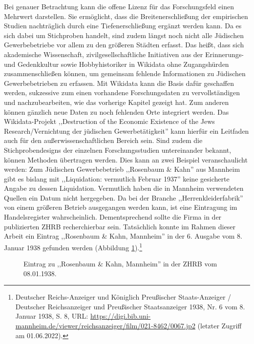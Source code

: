Bei genauer Betrachtung kann die offene Lizenz für das Forschungsfeld einen Mehrwert darstellen. Sie ermöglicht, dass die Breitenerschließung der empirischen Studien nachträglich durch eine Tiefenerschließung ergänzt werden kann. Da es sich dabei um Stichproben handelt, sind zudem längst noch nicht alle Jüdischen Gewerbebetriebe vor allem zu den größeren Städten erfasst. Das heißt, dass sich akademische Wissenschaft, zivilgesellschaftliche Initiativen aus der Erinnerungs- und Gedenkkultur sowie Hobbyhistoriker in Wikidata ohne Zugangshürden zusammenschließen können, um gemeinsam fehlende Informationen zu Jüdischen Gewerbebetrieben zu erfassen. Mit Wikidata kann die Basis dafür geschaffen werden, sukzessive zum einen vorhandene Forschungsdaten zu vervollständigen und nachzubearbeiten, wie das vorherige Kapitel gezeigt hat. Zum anderen können gänzlich neue Daten zu noch fehlenden Orte integriert werden. Das Wikidata-Projekt ,,Destruction of the Economic Existence of the Jews Research/Vernichtung der jüdischen Gewerbetätigkeit'' kann hierfür ein Leitfaden auch für den außerwissenschaftlichen Bereich sein. Sind zudem die Stichprobendesigns der einzelnen Forschungsstudien untereinander bekannt, können Methoden übertragen werden. Dies kann an zwei Beispiel veranschaulicht werden: Zum Jüdischen Gewerbebetrieb ,,Rosenbaum \& Kahn'' aus Mannheim gibt es bislang mit ,,Liquidation: vermutlich Februar 1937'' keine gesicherte Angabe zu dessen Liquidation. Vermutlich haben die in Mannheim verwendeten Quellen ein Datum nicht hergegeben. Da bei der Branche ,,Herrenkleiderfabrik'' von einem größeren Betrieb ausgegangen werden kann, ist eine Eintragung im Handelsregister wahrscheinlich. Dementsprechend sollte die Firma in der publizierten ZHRB recherchierbar sein. Tatsächlich konnte im Rahmen dieser Arbeit ein Eintrag ,,Rosenbaum \& Kahn, Mannheim'' in der 6. Ausgabe vom 8. Januar 1938 gefunden werden (Abbildung \ref{fig:zhrbmannheim}).\footnote{Deutscher Reichs-Anzeiger und Königlich Preußischer Staats-Anzeiger / Deutscher Reichsanzeiger und Preußischer Staatsanzeiger 1938, Nr. 6 vom 8. Januar 1938, S. 8, URL: \url{https://digi.bib.uni-mannheim.de/viewer/reichsanzeiger/film/021-8462/0067.jp2} (letzter Zugriff am 01.06.2022).}

\begin{figure}[h]
    \centering
    \caption{Eintrag zu ,,Rosenbaum \& Kahn, Mannheim'' in der ZHRB vom 08.01.1938.}
    \label{fig:zhrbmannheim}
\end{figure}


